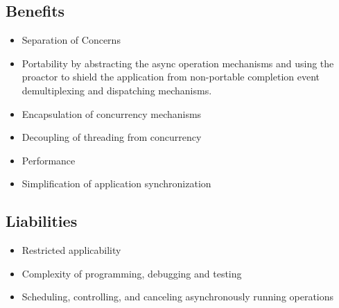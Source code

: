 \subsection*{Benefits}

\begin{itemize}
	\item Separation of Concerns
	\item Portability by abstracting the async operation mechanisms and using the proactor to shield the application from non-portable completion event demultiplexing and dispatching mechanisms.
	\item Encapsulation of concurrency mechanisms
	\item Decoupling of threading from concurrency
	\item Performance
	\item Simplification of application synchronization
\end{itemize}


\subsection*{Liabilities}

\begin{itemize}
	\item Restricted applicability
	\item Complexity of programming, debugging and testing
	\item Scheduling, controlling, and canceling asynchronously running operations
\end{itemize}

